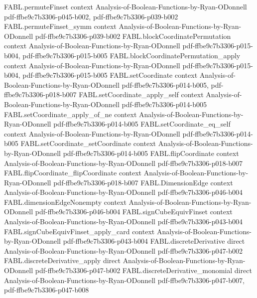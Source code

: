 \begin{theorem}
\proofstep
  {FABL.permuteFinset}
  {context}
  {Analysis-of-Boolean-Functions-by-Ryan-ODonnell}
  {pdf-ffbe9c7b3306-p045-b002,
    pdf-ffbe9c7b3306-p039-b002}
\proofstep
  {FABL.permuteFinset_symm}
  {context}
  {Analysis-of-Boolean-Functions-by-Ryan-ODonnell}
  {pdf-ffbe9c7b3306-p039-b002}
\proofstep
  {FABL.blockCoordinatePermutation}
  {context}
  {Analysis-of-Boolean-Functions-by-Ryan-ODonnell}
  {pdf-ffbe9c7b3306-p015-b004,
    pdf-ffbe9c7b3306-p015-b005}
\proofstep
  {FABL.blockCoordinatePermutation_apply}
  {context}
  {Analysis-of-Boolean-Functions-by-Ryan-ODonnell}
  {pdf-ffbe9c7b3306-p015-b004,
    pdf-ffbe9c7b3306-p015-b005}
\proofstep
  {FABL.setCoordinate}
  {context}
  {Analysis-of-Boolean-Functions-by-Ryan-ODonnell}
  {pdf-ffbe9c7b3306-p014-b005,
    pdf-ffbe9c7b3306-p018-b007}
\proofstep
  {FABL.setCoordinate_apply_self}
  {context}
  {Analysis-of-Boolean-Functions-by-Ryan-ODonnell}
  {pdf-ffbe9c7b3306-p014-b005}
\proofstep
  {FABL.setCoordinate_apply_of_ne}
  {context}
  {Analysis-of-Boolean-Functions-by-Ryan-ODonnell}
  {pdf-ffbe9c7b3306-p014-b005}
\proofstep
  {FABL.setCoordinate_eq_self}
  {context}
  {Analysis-of-Boolean-Functions-by-Ryan-ODonnell}
  {pdf-ffbe9c7b3306-p014-b005}
\proofstep
  {FABL.setCoordinate_setCoordinate}
  {context}
  {Analysis-of-Boolean-Functions-by-Ryan-ODonnell}
  {pdf-ffbe9c7b3306-p014-b005}
\proofstep
  {FABL.flipCoordinate}
  {context}
  {Analysis-of-Boolean-Functions-by-Ryan-ODonnell}
  {pdf-ffbe9c7b3306-p018-b007}
\proofstep
  {FABL.flipCoordinate_flipCoordinate}
  {context}
  {Analysis-of-Boolean-Functions-by-Ryan-ODonnell}
  {pdf-ffbe9c7b3306-p018-b007}
\proofstep
  {FABL.DimensionEdge}
  {context}
  {Analysis-of-Boolean-Functions-by-Ryan-ODonnell}
  {pdf-ffbe9c7b3306-p046-b004}
\proofstep
  {FABL.dimensionEdgeNonempty}
  {context}
  {Analysis-of-Boolean-Functions-by-Ryan-ODonnell}
  {pdf-ffbe9c7b3306-p046-b004}
\proofstep
  {FABL.signCubeEquivFinset}
  {context}
  {Analysis-of-Boolean-Functions-by-Ryan-ODonnell}
  {pdf-ffbe9c7b3306-p043-b004}
\proofstep
  {FABL.signCubeEquivFinset_apply_card}
  {context}
  {Analysis-of-Boolean-Functions-by-Ryan-ODonnell}
  {pdf-ffbe9c7b3306-p043-b004}
\proofstep
  {FABL.discreteDerivative}
  {direct}
  {Analysis-of-Boolean-Functions-by-Ryan-ODonnell}
  {pdf-ffbe9c7b3306-p047-b002}
\proofstep
  {FABL.discreteDerivative_apply}
  {direct}
  {Analysis-of-Boolean-Functions-by-Ryan-ODonnell}
  {pdf-ffbe9c7b3306-p047-b002}
\proofstep
  {FABL.discreteDerivative_monomial}
  {direct}
  {Analysis-of-Boolean-Functions-by-Ryan-ODonnell}
  {pdf-ffbe9c7b3306-p047-b007,
    pdf-ffbe9c7b3306-p047-b008}

\end{theorem}
